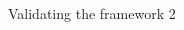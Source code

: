 \documentclass[]{beamer}
\begin{document}
\begin{frame}{Validating the framework 2}
\begin{columns}
\begin{column}{0.6\textwidth}
\end{column}

\end{columns}


\end{frame}


%
%

%
%
\end{document}
